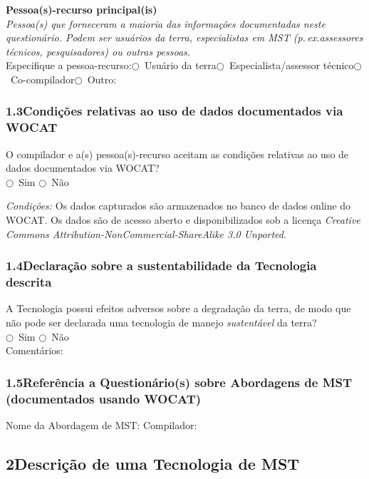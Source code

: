 \medskip\noindent\textbf{Pessoa(s)-recurso principal(is)}\\
\textit{Pessoa(s) que forneceram a maioria das informações documentadas neste questionário. Podem ser usuários da terra, especialistas em MST (p.\,ex.\@ assessores técnicos, pesquisadores) ou outras pessoas.}\\[4pt]
Especifique a pessoa-recurso:\quad $\bigcirc$~Usuário da terra\quad $\bigcirc$~Especialista/assessor técnico\quad $\bigcirc$~Co-compilador\quad $\bigcirc$~Outro: \dotfill

\subsubsection*{1.3\quad Condições relativas ao uso de dados documentados via WOCAT}

O compilador e a(s) pessoa(s)-recurso aceitam as condições relativas ao uso de dados documentados via WOCAT?\\
$\bigcirc$~Sim \qquad $\bigcirc$~Não

\medskip\noindent\textit{Condições:} Os dados capturados são armazenados no banco de dados online do WOCAT. Os dados são de acesso aberto e disponibilizados sob a licença \textit{Creative Commons Attribution-NonCommercial-ShareAlike 3.0 Unported}.

\subsubsection*{1.4\quad Declaração sobre a sustentabilidade da Tecnologia descrita}

A Tecnologia possui efeitos adversos sobre a degradação da terra, de modo que não pode ser declarada uma tecnologia de manejo \textit{sustentável} da terra?\\
$\bigcirc$~Sim \qquad $\bigcirc$~Não\\
Comentários: \dotfill

\subsubsection*{1.5\quad Referência a Questionário(s) sobre Abordagens de MST (documentados usando WOCAT)}

Nome da Abordagem de MST: \dotfill\quad Compilador: \dotfill

\subsection*{2\quad Descrição de uma Tecnologia de MST}

